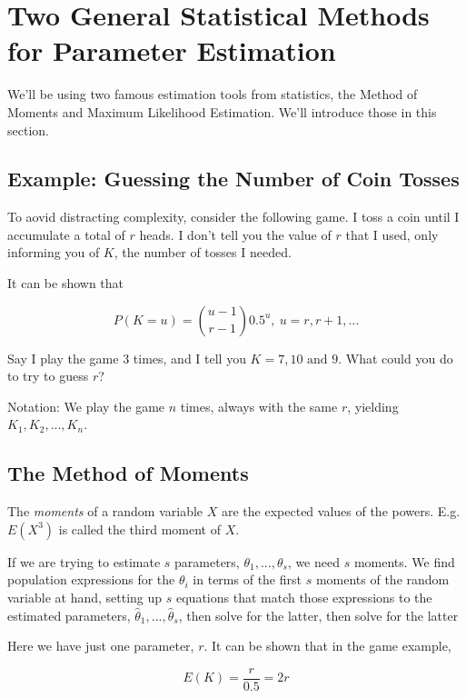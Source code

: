 \section{Two General Statistical Methods for Parameter Estimation}

We'll be using two famous estimation tools from statistics, the Method
of Moments and Maximum Likelihood Estimation.  We'll introduce those in
this section.

\subsection{Example:  Guessing the Number of Coin Tosses}

To aovid distracting complexity, consider the following game.  I toss a
coin until I accumulate a total of $r$ heads.  I don't tell you the
value of $r$ that I used, only informing you of $K$, the number of
tosses I needed.

It can be shown that

\begin{equation}
P(K = u) = \binom{u-1}{r-1} 0.5^u,~ u = r, r+1, ...
\end{equation}

Say I play the game 3 times, and I tell you $K = 7, 10 \textrm{ and }
9$.  What could you do to try to guess  $r$?

Notation:  We play the game $n$ times, always with the same $r$,
yielding $K_1, K_2,...,K_n$.

\subsection{The Method of Moments}
\label{mm}

The \textit{moments} of a random variable $X$ are the expected values of
the powers.  E.g. $E(X^{3})$ is called the third moment of $X$.

If we are trying to estimate $s$ parameters, $\theta_1,...,\theta_s$, we
need $s$ moments.  We find population expressions for the $\theta_i$  in
terms of the first $s$ moments of the random variable at hand, setting
up $s$ equations that match those expressions to the estimated
parameters, $\widehat{\theta}_1,...,\widehat{\theta}_s$, then solve for
the latter, then solve for the latter

Here we have just one parameter, $r$.  It can be shown that in the game
example,

\begin{equation}
\label{ek}
E(K) = \frac{r}{0.5} = 2r
\end{equation}

